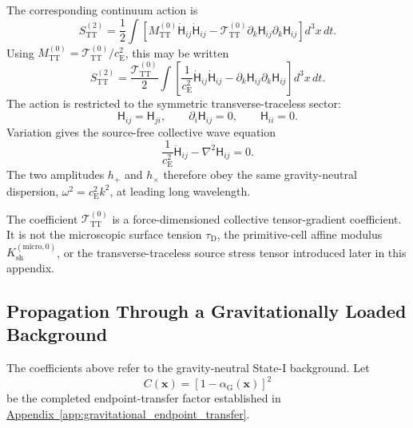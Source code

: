 The corresponding continuum action is
\begin{equation}
    S_{\mathrm{TT}}^{(2)} = \frac{1}{2} \int \left[ M_{\mathrm{TT}}^{(0)} \dot{\mathsf{H}}_{ij} \dot{\mathsf{H}}_{ij} - \mathcal{T}_{\mathrm{TT}}^{(0)} \partial_{k}\mathsf{H}_{ij} \partial_{k}\mathsf{H}_{ij} \right] d^{3}x\,dt.
\end{equation}
Using $M_{\mathrm{TT}}^{(0)} = \mathcal{T}_{\mathrm{TT}}^{(0)} / c_{\mathrm{E}}^{2}$, this may be written
\begin{equation}
    S_{\mathrm{TT}}^{(2)} = \frac{ \mathcal{T}_{\mathrm{TT}}^{(0)} }{2} \int \left[ \frac{1}{c_{\mathrm{E}}^{2}} \dot{\mathsf{H}}_{ij} \dot{\mathsf{H}}_{ij} - \partial_{k}\mathsf{H}_{ij} \partial_{k}\mathsf{H}_{ij} \right] d^{3}x\,dt.
\end{equation}
The action is restricted to the symmetric transverse-traceless sector:
\begin{equation}
    \mathsf{H}_{ij} = \mathsf{H}_{ji}, \qquad \partial_{i}\mathsf{H}_{ij} = 0, \qquad \mathsf{H}_{ii} = 0.
\end{equation}
Variation gives the source-free collective wave equation
\begin{equation}
    \frac{1}{c_{\mathrm{E}}^{2}} \ddot{\mathsf{H}}_{ij} - \nabla^{2}\mathsf{H}_{ij} = 0.
\end{equation}
The two amplitudes $h_{+}$ and $h_{\times}$ therefore obey the same gravity-neutral dispersion, $\omega^{2} = c_{\mathrm{E}}^{2}k^{2}$, at leading long wavelength.

The coefficient $\mathcal{T}_{\mathrm{TT}}^{(0)}$ is a force-dimensioned collective tensor-gradient coefficient. It is not the microscopic surface tension $\tau_{\mathrm{D}}$, the primitive-cell affine modulus $K_{\mathrm{sh}}^{(\mathrm{micro},0)}$, or the transverse-traceless source stress tensor introduced later in this appendix.

\subsection{Propagation Through a Gravitationally Loaded Background}
\label{subsec:propagation_gravity_background}

The coefficients above refer to the gravity-neutral State-I background. Let
\begin{equation}
    C(\mathbf{x}) = \left[ 1-\alpha_{\mathrm{G}}(\mathbf{x}) \right]^{2}
\end{equation}
be the completed endpoint-transfer factor established in \hyperref[app:gravitational_endpoint_transfer]{Appendix~\ref*{app:gravitational_endpoint_transfer}}.

